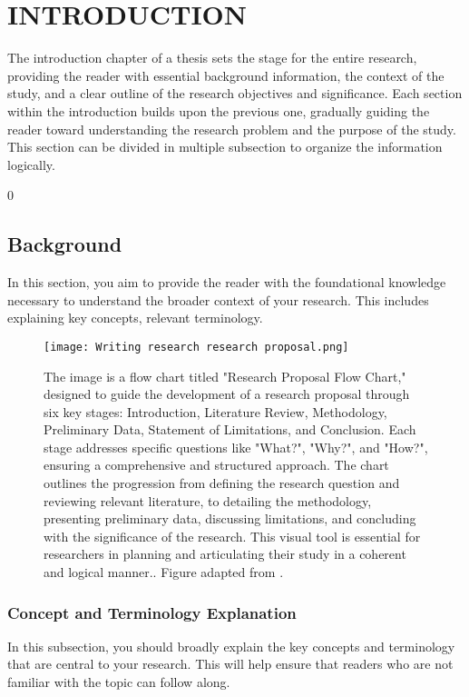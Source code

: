 \chapter{INTRODUCTION}
The introduction chapter of a thesis sets the stage for the entire research, providing the reader with essential background information, the context of the study, and a clear outline of the research objectives and significance. Each section within the introduction builds upon the previous one, gradually guiding the reader toward understanding the research problem and the purpose of the study. This section can be divided in multiple subsection to organize the information logically.

0\section{Background}

In this section, you aim to provide the reader with the foundational knowledge necessary to understand the broader context of your research. This includes explaining key concepts, relevant terminology.


\begin{figure}
	\centering
	\texttt{[image: Writing research research proposal.png]}
	\caption[Research Proposal Flow Chart]
	{The image is a flow chart titled "Research Proposal Flow Chart," designed to guide the development of a research proposal through six key stages: Introduction, Literature Review, Methodology, Preliminary Data, Statement of Limitations, and Conclusion. Each stage addresses specific questions like "What?", "Why?", and "How?", ensuring a comprehensive and structured approach. The chart outlines the progression from defining the research question and reviewing relevant literature, to detailing the methodology, presenting preliminary data, discussing limitations, and concluding with the significance of the research. This visual tool is essential for researchers in planning and articulating their study in a coherent and logical manner.. Figure adapted from \cite{Dorsett2010}.}
	\label{fig:ExxonSpreading}
\end{figure}
%


\subsection{Concept and Terminology Explanation}

In this subsection, you should broadly explain the key concepts and terminology that are central to your research. This will help ensure that readers who are not familiar with the topic can follow along.




